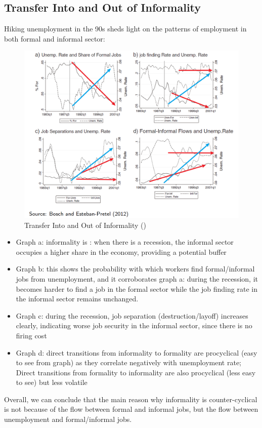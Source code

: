             \subsection{Transfer Into and Out of Informality}
                Hiking unemployment in the 90s sheds light on the patterns of employment in both formal and informal sector:
                \begin{figure}[H]
                    \centering
                    \includegraphics[width=5.5in]{images/ch5/ins and outs of informality.png}
                    \caption{Transfer Into and Out of Informality (\cite{bosch_job_2012})}
                \end{figure}
                \begin{itemize}
                    \item Graph a: informality is : when there is a recession, the informal sector occupies a higher share in the economy, providing a potential buffer
                    \item Graph b: this shows the probability with which workers find formal/informal jobs from unemployment, and it corroborates graph a: during the recession, it becomes harder to find a job in the formal sector while the job finding rate in the informal sector remains unchanged.
                    \item Graph c: during the recession, job separation (destruction/layoff) increases clearly, indicating worse job security in the informal sector, since there is no firing cost
                    \item Graph d: direct transitions from informality to formality are procyclical (easy to see from graph) as they correlate negatively with unemployment rate; Direct transitions from formality to informality are also procyclical (less easy to see) but less volatile
                \end{itemize}
                Overall, we can conclude that the main reason why informality is counter-cyclical is not because of the flow between formal and informal jobs, but the flow between unemployment and formal/informal jobs.
            
